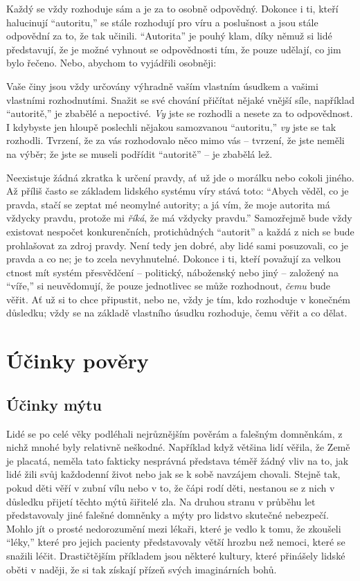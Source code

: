 \documentclass{book}
\begin{document}
Každý se vždy rozhoduje sám a je za to osobně odpovědný. Dokonce i ti, kteří halucinují \enquote{autoritu,} se stále rozhodují pro víru a poslušnost a jsou stále odpovědní za to, že tak učinili. \enquote{Autorita} je pouhý klam, díky němuž si lidé představují, že je možné vyhnout se odpovědnosti tím, že pouze udělají, co jim bylo řečeno. Nebo, abychom to vyjádřili osobněji:

Vaše činy jsou vždy určovány výhradně vaším vlastním úsudkem a vašimi vlastními rozhodnutími. Snažit se své chování přičítat nějaké vnější síle, například \enquote{autoritě,} je zbabělé a nepoctivé. \emph{Vy} jste se rozhodli a nesete za to odpovědnost. I kdybyste jen hloupě poslechli nějakou samozvanou \enquote{autoritu,} \emph{vy} jste se tak rozhodli. Tvrzení, že za vás rozhodovalo něco mimo vás -- tvrzení, že jste neměli na výběr; že jste se museli podřídit \enquote{autoritě} -- je zbabělá lež.

Neexistuje žádná zkratka k určení pravdy, ať už jde o morálku nebo cokoli jiného. Až příliš často se základem lidského systému víry stává toto: \enquote{Abych věděl, co je pravda, stačí se zeptat mé neomylné autority; a já vím, že moje autorita má vždycky pravdu, protože mi \emph{říká}, že má vždycky pravdu.} Samozřejmě bude vždy existovat nespočet konkurenčních, protichůdných \enquote{autorit} a každá z nich se bude prohlašovat za zdroj pravdy. Není tedy jen dobré, aby lidé sami posuzovali, co je pravda a co ne; je to zcela nevyhnutelné. Dokonce i ti, kteří považují za velkou ctnost mít systém přesvědčení -- politický, náboženský nebo jiný -- založený na \enquote{víře,} si neuvědomují, že pouze jednotlivec se může rozhodnout, \emph{čemu} bude věřit. Ať už si to chce připustit, nebo ne, vždy je tím, kdo rozhoduje v konečném důsledku; vždy se na základě vlastního úsudku rozhoduje, čemu věřit a co dělat.

\chapter{Účinky pověry}

\section{Účinky mýtu}

Lidé se po celé věky podléhali nejrůznějším pověrám a falešným domněnkám, z nichž mnohé byly relativně neškodné. Například když většina lidí věřila, že Země je placatá, neměla tato fakticky nesprávná představa téměř žádný vliv na to, jak lidé žili svůj každodenní život nebo jak se k sobě navzájem chovali. Stejně tak, pokud děti věří v zubní vílu nebo v to, že čápi rodí děti, nestanou se z nich v důsledku přijetí těchto mýtů šiřitelé zla. Na druhou stranu v průběhu let představovaly jiné falešné domněnky a mýty pro lidstvo skutečné nebezpečí. Mohlo jít o prosté nedorozumění mezi lékaři, které je vedlo k tomu, že zkoušeli \enquote{léky,} které pro jejich pacienty představovaly větší hrozbu než nemoci, které se snažili léčit. Drastičtějším příkladem jsou některé kultury, které přinášely lidské oběti v naději, že si tak získají přízeň svých imaginárních bohů.
\end{document}
